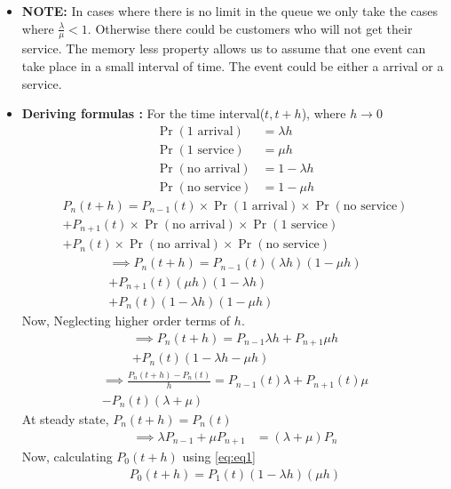 \documentclass[journal,12pt,twocolumn]{IEEEtran}
\begin{document}
\begin{itemize}
\item \textbf{NOTE:} In cases where there is no limit in the queue we only take the cases where $\frac{\lambda}{\mu}<1$. Otherwise there could be customers who will not get their service. \newline The memory less property allows us to assume that one event can take place in a small interval of time. The event could be either a arrival or a service.
\item\textbf{Deriving formulas :}
 For the time interval($t,t+h$), where $h \to 0$
\begin{align}
    \Pr{(\text{1 arrival})}&=\lambda h\\
    \Pr{(\text{1 service})}&=\mu h\\
    \Pr{(\text{no arrival})}&=1-\lambda h\\
    \Pr{(\text{no service})}&=1-\mu h
\end{align}
\begin{multline}
    P_{n}(t+h)=P_{n-1}(t)\times\Pr{(\text{1 arrival})}\times\Pr{(\text{no service})}\\
    +P_{n+1}(t)\times\Pr{(\text{no arrival})}\times\Pr{(\text{1 service})}\\
    +P_n(t)\times\Pr{(\text{no arrival})}\times\Pr{(\text{no service})}\label{eq:eq1}
\end{multline}
\begin{multline}
    \implies P_{n}(t+h)=P_{n-1}(t)(\lambda h)(1-\mu h)\\
    +P_{n+1}(t)(\mu h)(1- \lambda h)\\
    +P_n(t)(1-\lambda h)(1-\mu h)
\end{multline}
Now, Neglecting higher order terms of $h$.
\begin{multline}
    \implies P_{n}(t+h)=P_{n-1}\lambda h+P_{n+1}\mu h\\
    +P_n(t)(1-\lambda h-\mu h)
\end{multline}
\begin{multline}
    \implies \frac{P_n(t+h)-P_n(t)}{h}=P_{n-1}(t)\lambda+P_{n+1}(t)\mu\\
    -P_n(t)(\lambda+\mu)
\end{multline}
At steady state, $P_n(t+h)=P_n(t)$
\begin{align}
    \implies\lambda P_{n-1}+\mu P_{n+1}&=(\lambda+\mu)P_n\label{eq:res1}
\end{align}
Now, calculating $P_0(t+h)$ using \eqref{eq:eq1}
\begin{multline}
    P_0(t+h)=P_1(t)(1-\lambda h)(\mu h)\\

\end{multline}
\end{itemize}
\end{document}
